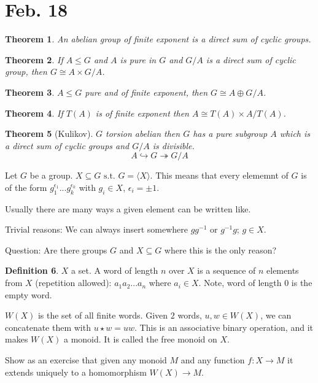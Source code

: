 \documentclass{amsart}
\newtheorem{thm}{Theorem}[section]
\theoremstyle{definition}
\newtheorem{definition}[thm]{Definition}
\newcommand{\st}{\text{ s.t. }}
\begin{document}
\section{Feb. 18}
\begin{thm}
An abelian group of finite exponent is a direct sum of cyclic groups.	
\end{thm}
\begin{thm}
	If $A\leq G$ and $A$ is pure in $G$ and $G/A$ is a direct sum of cyclic group, then $G\cong A\times G/A$. 	
\end{thm}
\begin{thm}
$A\leq G$ pure and of finite exponent, then $G\cong A\oplus G/A$.	
\end{thm}
\begin{thm}
If $T(A)$ is of finite exponent then $A\cong T(A)\times A/T(A)$.	
\end{thm}
\begin{thm}[Kulikov]
	$G$ torsion abelian then $G$ has a pure subgroup $A$ which is a direct sum of cyclic groups and $G/A$ is divisible.
	$$A\hookrightarrow G\twoheadrightarrow G/A$$
\end{thm}
Let $G$ be a group. $X\subseteq G\st G=\langle X\rangle$. This means that every elememnt of $G$ is of the form $g_1^{\epsilon_1}...g_k^{\epsilon_k}$ with $g_i\in X$, $\epsilon_i=\pm 1$.

Usually there are many ways a given element can be written like.

Trivial reasons: We can always insert somewhere $gg^{-1}$ or $g^{-1}g$; $g\in X$.

Question: Are there groups $G$ and $X\subseteq G$ where this is the only reason?

\begin{definition}
	$X$ a set. A word of length $n$ over $X$ is a sequence of $n$ elements from $X$ (repetition allowed): $a_1a_2...a_n$ where $a_i\in X$. Note, word of length 0 is the empty word.
	
	$W(X)$ is the set of all finite words. Given $2$ words, $u,w\in W(X)$, we can concatenate them with $u\star w=uw$. This is an associative binary operation, and it makes $W(X)$ a monoid. It is called the free monoid on $X$. 
\end{definition}
Show as an exercise that given any monoid $M$ and any function $f:X\to M$ it extends uniquely to a homomorphism $W(X)\to M$.
\end{document}
